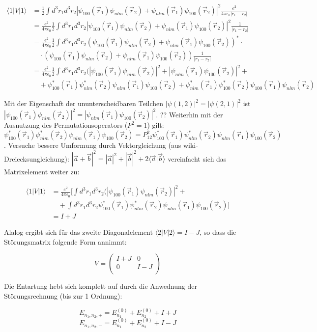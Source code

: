 \begin{align}
\langle 1|V|1\rangle &= \frac{1}{2} \int d^3 r_1 d^3r_2 |\psi_{100}(\vec r_1)\psi_{nlm}(\vec r_2)  + \psi_{nlm}(\vec r_1) \psi_{100}(\vec r_2)|^2  \frac{ e^2}{4\pi\epsilon_0 |r_1-r_2|} \\
&=\frac{ e^2}{4\pi\epsilon_0 }  \frac{1}{2} \int d^3 r_1 d^3r_2 |\psi_{100}(\vec r_1)\psi_{nlm}(\vec r_2)  + \psi_{nlm}(\vec r_1) \psi_{100}(\vec r_2)|^2  \frac{ 1}{|r_1-r_2|} \\
&=\frac{ e^2}{4\pi\epsilon_0 }  \frac{1}{2} \int d^3 r_1 d^3r_2 (\psi_{100}(\vec r_1)\psi_{nlm}(\vec r_2)  + \psi_{nlm}(\vec r_1) \psi_{100}(\vec r_2))^*\cdot\\
&\quad \cdot (\psi_{100}(\vec r_1)\psi_{nlm}(\vec r_2)  + \psi_{nlm}(\vec r_1) \psi_{100}(\vec r_2))   \frac{ 1}{|r_1-r_2|} \\
&=\frac{ e^2}{4\pi\epsilon_0 }  \frac{1}{2} \int d^3 r_1 d^3r_2 ( |\psi_{100}(\vec r_1)\psi_{nlm}(\vec r_2)|^2+|\psi_{nlm}(\vec r_1) \psi_{100}(\vec r_2)|^2+\\
&\quad + \psi_{100}^*(\vec r_1)\psi_{nlm}^*(\vec r_2) \psi_{nlm}(\vec r_1) \psi_{100}(\vec r_2) + \psi_{nlm}^*(\vec r_1) \psi_{100}^*(\vec r_2)\psi_{100}(\vec r_1)\psi_{nlm}(\vec r_2)
\end{align}

Mit der Eigenschaft der ununterscheidbaren Teilchen \(|\psi(1,2)|^2 = |\psi(2,1)|^2 \) ist \(|\psi_{100}(\vec r_1)\psi_{nlm}(\vec r_2)|^2 =|\psi_{nlm}(\vec r_1) \psi_{100}(\vec r_2)|^2 \). ?? Weiterhin mit der Ausnutzung des Permutationsoperators (\(P^2=1\)) gilt: \(\psi_{100}^*(\vec r_1)\psi_{nlm}^*(\vec r_2) \psi_{nlm}(\vec r_1) \psi_{100}(\vec r_2) = P_{12}^2  \psi_{100}^*(\vec r_1)\psi_{nlm}^*(\vec r_2) \psi_{nlm}(\vec r_1) \psi_{100}(\vec r_2)\). Versuche bessere Umformung durch Vektorgleichung (aus wiki-Dreiecksungleichung): \( |\vec a + \vec b|^2=|\vec a|^2+|\vec b|^2+2\langle \vec a|\vec b\rangle   \)  vereinfacht sich das Matrixelement weiter zu:

\begin{align}
\langle 1|V|1\rangle &= \frac{ e^2}{4\pi\epsilon_0 } [ \int d^3 r_1 d^3r_2 ( |\psi_{100}(\vec r_1)\psi_{nlm}(\vec r_2)|^2 +\\
&\quad + \int d^3 r_1 d^3r_2 \psi_{100}^*(\vec r_1)\psi_{nlm}^*(\vec r_2) \psi_{nlm}(\vec r_1) \psi_{100}(\vec r_2) ] \\
&= I+J
\end{align}

Alalog ergibt sich für das zweite Diagonalelement \(\langle 2|V|2\rangle =I-J\), so dass die Störungsmatrix folgende Form annimmt:

\[V =  \begin{pmatrix} I+J & 0 \\
 0 & I-J \\
\end{pmatrix} \]

Die Entartung hebt sich komplett auf durch die Anwednung der Störungsrechnung (bis zur 1 Ordnung):

\[E_{n_1,n_2,+} = E_{n_1}^{(0)}+E_{n_2}^{(0)}+I+J\]
\[E_{n_1,n_2,-} = E_{n_1}^{(0)}+E_{n_2}^{(0)}+I-J\]








 
